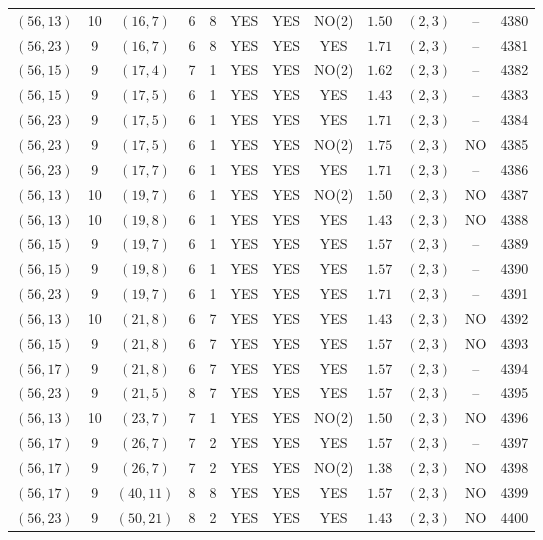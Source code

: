 \begin{longtable}{|c|c|c|c|c|c|c|c|c|c|c|c|}
$(56,13)$ & 10 & $(16,7)$ & 6 & 8 & YES & YES & NO(2) & $1.50$ & $(2,3)$ & -- & 4380\\
$(56,23)$ & 9 & $(16,7)$ & 6 & 8 & YES & YES & YES & $1.71$ & $(2,3)$ & -- & 4381\\
$(56,15)$ & 9 & $(17,4)$ & 7 & 1 & YES & YES & NO(2) & $1.62$ & $(2,3)$ & -- & 4382\\
$(56,15)$ & 9 & $(17,5)$ & 6 & 1 & YES & YES & YES & $1.43$ & $(2,3)$ & -- & 4383\\
$(56,23)$ & 9 & $(17,5)$ & 6 & 1 & YES & YES & YES & $1.71$ & $(2,3)$ & -- & 4384\\
$(56,23)$ & 9 & $(17,5)$ & 6 & 1 & YES & YES & NO(2) & $1.75$ & $(2,3)$ & NO & 4385\\
$(56,23)$ & 9 & $(17,7)$ & 6 & 1 & YES & YES & YES & $1.71$ & $(2,3)$ & -- & 4386\\
$(56,13)$ & 10 & $(19,7)$ & 6 & 1 & YES & YES & NO(2) & $1.50$ & $(2,3)$ & NO & 4387\\
$(56,13)$ & 10 & $(19,8)$ & 6 & 1 & YES & YES & YES & $1.43$ & $(2,3)$ & NO & 4388\\
$(56,15)$ & 9 & $(19,7)$ & 6 & 1 & YES & YES & YES & $1.57$ & $(2,3)$ & -- & 4389\\
$(56,15)$ & 9 & $(19,8)$ & 6 & 1 & YES & YES & YES & $1.57$ & $(2,3)$ & -- & 4390\\
$(56,23)$ & 9 & $(19,7)$ & 6 & 1 & YES & YES & YES & $1.71$ & $(2,3)$ & -- & 4391\\
$(56,13)$ & 10 & $(21,8)$ & 6 & 7 & YES & YES & YES & $1.43$ & $(2,3)$ & NO & 4392\\
$(56,15)$ & 9 & $(21,8)$ & 6 & 7 & YES & YES & YES & $1.57$ & $(2,3)$ & NO & 4393\\
$(56,17)$ & 9 & $(21,8)$ & 6 & 7 & YES & YES & YES & $1.57$ & $(2,3)$ & -- & 4394\\
$(56,23)$ & 9 & $(21,5)$ & 8 & 7 & YES & YES & YES & $1.57$ & $(2,3)$ & -- & 4395\\
$(56,13)$ & 10 & $(23,7)$ & 7 & 1 & YES & YES & NO(2) & $1.50$ & $(2,3)$ & NO & 4396\\
$(56,17)$ & 9 & $(26,7)$ & 7 & 2 & YES & YES & YES & $1.57$ & $(2,3)$ & -- & 4397\\
$(56,17)$ & 9 & $(26,7)$ & 7 & 2 & YES & YES & NO(2) & $1.38$ & $(2,3)$ & NO & 4398\\
$(56,17)$ & 9 & $(40,11)$ & 8 & 8 & YES & YES & YES & $1.57$ & $(2,3)$ & NO & 4399\\
$(56,23)$ & 9 & $(50,21)$ & 8 & 2 & YES & YES & YES & $1.43$ & $(2,3)$ & NO & 4400\\

\end{longtable}
